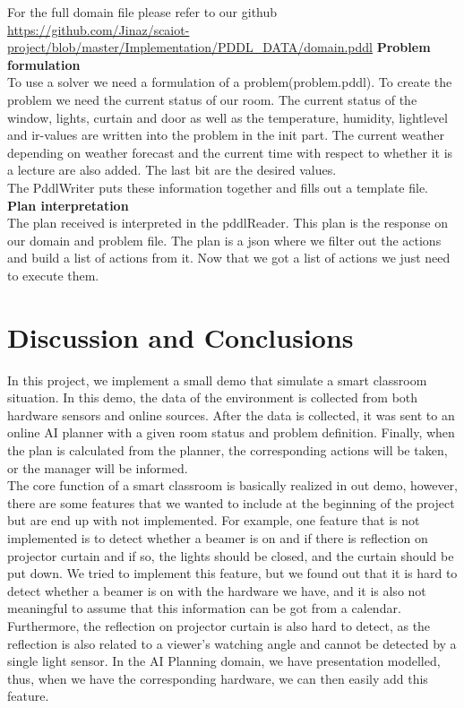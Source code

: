 \documentclass[runningheads]{llncs}
\begin{document}
For the full domain file please refer to our github \url{https://github.com/Jinaz/scaiot-project/blob/master/Implementation/PDDL_DATA/domain.pddl}
\newline
\textbf{Problem formulation}\\
To use a solver we need a formulation of a problem(problem.pddl).
To create the problem we need the current status of our room.
The current status of the window, lights, curtain and door as well as the temperature, humidity, lightlevel and ir-values are written into the problem in the init part. The current weather depending on weather forecast and the current time with respect to whether it is a lecture are also added. 
The last bit are the desired values.\\
The PddlWriter puts these information together and fills out a template file. 
\newline
\textbf{Plan interpretation}\\
The plan received is interpreted in the pddlReader. This plan is the response on our domain and problem file. The plan is a json where we filter out the actions and build a list of actions from it. 
Now that we got a list of actions we just need to execute them.

\section{Discussion and Conclusions}
In this project, we implement a small demo that simulate a smart classroom situation. In this demo, the data of the environment is collected from both hardware sensors and online sources. After the data is collected, it was sent to an online AI planner with a given room status and problem definition. Finally, when the plan is calculated from the planner, the corresponding actions will be taken, or the manager will be informed.\\

The core function of a smart classroom is basically realized in out demo, however, there are some features that we wanted to include at the beginning of the project but are end up with not implemented. For example, one feature that is not implemented is to detect whether a beamer is on and if there is reflection on projector curtain and if so, the lights should be closed, and the curtain should be put down. We tried to implement this feature, but we found out that it is hard to detect whether a beamer is on with the hardware we have, and it is also not meaningful to assume that this information can be got from a calendar. Furthermore, the reflection on projector curtain is also hard to detect, as the reflection is also related to a viewer’s watching angle and cannot be detected by a single light sensor. In the AI Planning domain, we have presentation modelled, thus, when we have the corresponding hardware, we can then easily add this feature.\\
\end{document}
